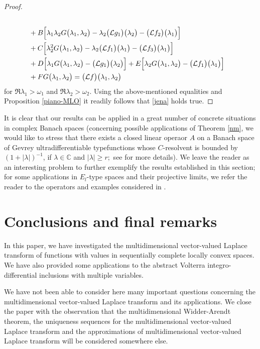 \documentclass{amsart}
\theoremstyle{definition}
\theoremstyle{remark}
\numberwithin{equation}{section}
\begin{document}
\begin{proof}
\begin{align*}
\\&+B\Bigl[ \lambda_{1}\lambda_{2} G \bigl(\lambda_{1},\lambda_{2}\bigr)-\lambda_{2}\bigl({\mathcal L} g_{1}\bigr)\bigl( \lambda_{2} \bigr)-\bigl({\mathcal L} f_{2}\bigr)\bigl( \lambda_{1} \bigr)\Bigr]
\\& +C\Bigl[\lambda_{2}^{2} G \bigl(\lambda_{1},\lambda_{2}\bigr)-\lambda_{2}\bigl({\mathcal L} f_{1}\bigr)\bigl( \lambda_{1} \bigr)-\bigl({\mathcal L} f_{3}\bigr)\bigl( \lambda_{1} \bigr)\Bigr]
\\& +D\Bigl[\lambda_{1}G\bigl(\lambda_{1},\lambda_{2}\bigr)-\bigl({\mathcal L}g_{1} \bigr)\bigl( \lambda_{2} \bigr)  \Bigr]+E\Bigl[\lambda_{2}G\bigl(\lambda_{1},\lambda_{2}\bigr)-\bigl({\mathcal L}f_{1} \bigr)\bigl( \lambda_{1} \bigr)  \Bigr]\\&+FG\bigl(\lambda_{1},\lambda_{2}\bigr)=\bigl({\mathcal L} f\bigr)\bigl(\lambda_{1},\lambda_{2}\bigr)
\end{align*}
for $ \Re \lambda_{1} >\omega_{1}$ and $ \Re \lambda_{2}>\omega_{2} .$ Using the above-mentioned equalities and Proposition \ref{piano-MLO} it readily follows that \eqref{jena} holds true. 
\end{proof}

It is clear that our results can be applied in a great number of concrete situations in complex Banach spaces (concerning possible applications of Theorem \ref{nm}, we would like to stress that there exists a closed linear operaor $A$ on a Banach space of Gevrey ultradifferentiable typefunctions whose $C$-resolvent is bounded by $(1+|\lambda|)^{-1}$, if $\lambda \in {\mathbb C}$ and $|\lambda|\geq r;$ see  \cite[Section 3.3.2]{funkcionalne} for more details). We leave the reader as an interesting problem to further exemplify the results established in this section; for some applications in $E_{l}$-type spaces and their projective limits, we refer the reader to the operators and examples considered in \cite{FKP,chelj,x263}.

\section{Conclusions and final remarks}\label{finale}

In this paper, we have investigated the multidimensional vector-valued Laplace transform of functions with values in sequentially complete locally convex spaces. We have also provided some applications to the abstract Volterra integro-differential inclusions with multiple variables.

We have not been able to consider here many important questions concerning the multidimensional vector-valued Laplace transform and its applications. We close the paper with the observation that the multidimensional Widder-Arendt theorem, the uniqueness sequences for the multidimensional vector-valued Laplace transform and the approximations of multidimensional vector-valued Laplace transform will be considered somewhere else.
\end{document}

